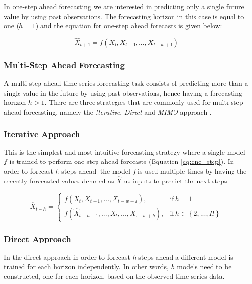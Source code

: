 \documentclass[a4paper, 12pt]{article}
\numberwithin{equation}{section}
\numberwithin{figure}{section}
\numberwithin{table}{section}
\begin{document}
	In one-step ahead forecasting we are interested in predicting only a single future value by using past observations. The forecasting horizon in this case is equal to one ($h=1$) and the equation for one-step ahead forecasts is given below:
	
	\begin{equation} \label{eq:one_step}
		\hat{X}_{t+1} = f(X_t, X_{t-1}, ..., X_{t-w+1})
	\end{equation}
	
	\subsubsection{Multi-Step Ahead Forecasting}
	
	A multi-step ahead time series forecasting task consists of predicting more than a single value in the future by using past observations, hence having a forecasting horizon $h>1$. There are three strategies that are commonly used for multi-step ahead forecasting, namely the \textit{Iterative}, \textit{Direct} and \textit{ MIMO} approach \cite{multi_step}.
	
	\newpage
	
	\subsubsection*{Iterative Approach}

	This is the simplest and most intuitive forecasting strategy where a single model $f$ is trained to perform one-step ahead forecasts (Equation \ref{eq:one_step}). In order to forecast $h$ steps ahead, the model $f$ is used multiple times by having the recently forecasted values denoted as $\hat{X}$ as inputs to predict the next steps.

	\begin{equation}
		\hat{X}_{t+h} = 
		\begin{cases}
			f(X_t, X_{t-1}, ..., X_{t-w+h}), & \text{if} \ h=1 \\
			f(\hat{X}_{t+h-1}, ...,  X_t, ..., X_{t-w+h}), & \text{if} \  h \in \left\{2, ..., H\right\}
		\end{cases}
	\end{equation}
	
	\subsubsection*{Direct Approach}

	In the direct approach in order to forecast $h$ steps ahead a different model is trained for each horizon independently. In other words, $h$ models need to be constructed, one for each horizon, based on the observed time series data.
	
\end{document}
